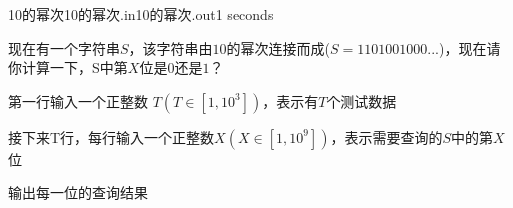 \begin{problem}{10的幂次}{10的幂次.in}{10的幂次.out}{1 seconds}

现在有一个字符串$S$，该字符串由$10$的幂次连接而成($S=1101001000...$)，现在请你计算一下，S中第$X$位是$0$还是$1$？

\InputFile

第一行输入一个正整数 $T(T \in [1,10^3])$，表示有$T$个测试数据

接下来T行，每行输入一个正整数$X(X \in [1,10^9])$，表示需要查询的$S$中的第$X$位

\OutputFile

输出每一位的查询结果

\Example

\begin{example}
%
\end{example}
\end{problem}
